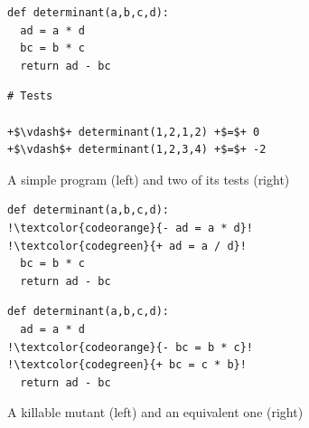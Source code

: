\documentclass[sigconf,review,anonymous]{acmart}
\begin{document}
\begin{figure}[t]
\begin{minipage}{.45\columnwidth}  %
\begin{lstlisting}[style=python]
def determinant(a,b,c,d):
  ad = a * d
  bc = b * c
  return ad - bc
\end{lstlisting}
\end{minipage}
\hfill
\begin{minipage}{0.5\columnwidth} %
\begin{lstlisting}[style=python,escapechar=+, numbers=none]
# Tests

+$\vdash$+ determinant(1,2,1,2) +$=$+ 0
+$\vdash$+ determinant(1,2,3,4) +$=$+ -2
\end{lstlisting}
\end{minipage}
\caption{A simple program (left) and two of its tests (right)}
\label{fig:working-example}
%
\end{figure}
%
\begin{figure}[t]
\begin{minipage}{.45\columnwidth}  %
\begin{lstlisting}[style=python,escapechar=!]
def determinant(a,b,c,d):
!\textcolor{codeorange}{- ad = a * d}!
!\textcolor{codegreen}{+ ad = a / d}!
  bc = b * c
  return ad - bc
\end{lstlisting}
\end{minipage}
\hfill
\begin{minipage}{0.5\columnwidth} %
\begin{lstlisting}[style=python,escapechar=!, numbers=none]
def determinant(a,b,c,d):
  ad = a * d
!\textcolor{codeorange}{- bc = b * c}!
!\textcolor{codegreen}{+ bc = c * b}!
  return ad - bc
\end{lstlisting}
\end{minipage}
\vspace*{-4mm}
\caption{A killable mutant (left) and an equivalent one (right)}
\label{fig:working-example-mutants}
\end{figure}
\end{document}
